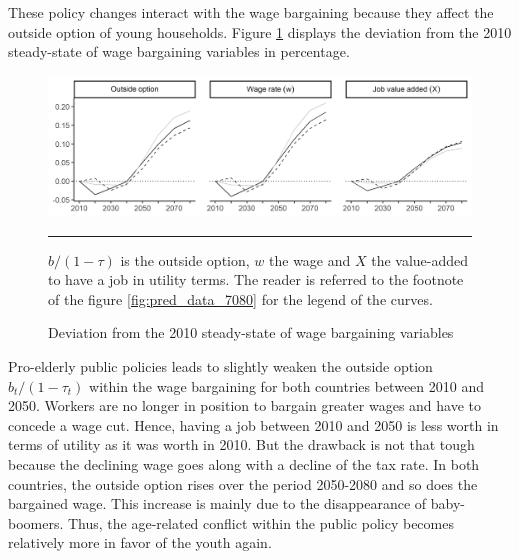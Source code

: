 These policy changes interact with the wage bargaining because they affect the outside option of young households. Figure \ref{fig:dev_bargain_1080} displays the deviation from the 2010 steady-state of wage bargaining variables in percentage.
\begin{figure}[tb]
	\centering
	\includegraphics[width=1\linewidth]{../result/deviation/dev_bargain1080.png}
	\caption{Deviation from the 2010 steady-state of wage bargaining variables}
	\label{fig:dev_bargain_1080}
	\vspace{.5ex}
	\hrule
	\vspace{-4ex}
	\justify\singlespacing\footnotesize $b/(1-\tau)$ is the outside option, $w$ the wage and $X$ the value-added to have a job in utility terms. The reader is referred to the footnote of the figure \ref{fig:pred_data_7080} for the legend of the curves.
\end{figure}
Pro-elderly public policies leads to slightly weaken the outside option $b_t/(1-\tau_t)$ within the wage bargaining for both countries between 2010 and 2050. Workers are no longer in position to bargain greater wages and have to concede a wage cut. Hence, having a job between 2010 and 2050 is less worth in terms of utility as it was worth in 2010. But the drawback is not that tough because the declining wage goes along with a decline of the tax rate. In both countries, the outside option rises over the period 2050-2080 and so does the bargained wage. This increase is mainly due to the disappearance of baby-boomers. Thus, the age-related conflict within the public policy becomes relatively more in favor of the youth again.

